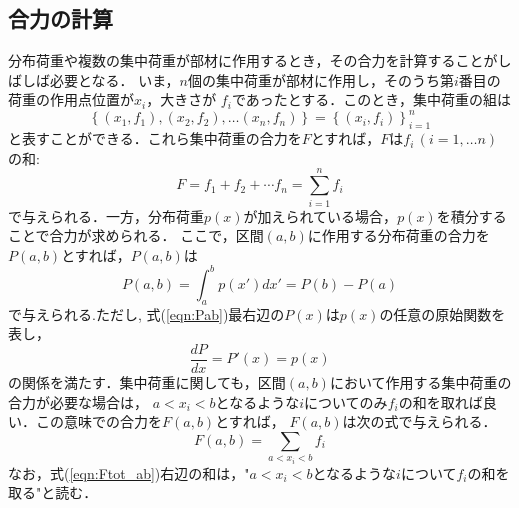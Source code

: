\documentclass[10pt,a4j]{jbook}
\begin{document}
\subsection{合力の計算}
分布荷重や複数の集中荷重が部材に作用するとき，その合力を計算することがしばしば必要となる．
いま，$n$個の集中荷重が部材に作用し，そのうち第$i$番目の荷重の作用点位置が$x_i$，大きさが
$f_i$であったとする．このとき，集中荷重の組は
\[
	\left\{ 
	(x_1,f_1),(x_2,f_2),\dots (x_n,f_n)
	\right\}
	=
	\left\{
		(x_i,f_i)
	\right\}_{i=1}^n
\]
と表すことができる．これら集中荷重の合力を$F$とすれば，$F$は$f_i\, (i=1,\dots n)$の和:
\begin{equation}
	F=f_1+f_2+\cdots f_n=\sum_{i=1}^n f_i
	\label{eq:Ftot}
\end{equation}
で与えられる．一方，分布荷重$p(x)$が加えられている場合，$p(x)$を積分することで合力が求められる．
ここで，区間$(a,b)$に作用する分布荷重の合力を$P(a,b)$とすれば，$P(a,b)$は
\begin{equation}
	P(a,b)=\int_{a}^{b}p(x')dx'=P(b)-P(a)
	\label{eqn:Pab}
\end{equation}
で与えられる.ただし, 式(\ref{eqn:Pab})最右辺の$P(x)$は$p(x)$の任意の原始関数を表し，
\begin{equation}
	\frac{dP}{dx}=P'(x)=p(x)
	\label{eqn:dPdx}
\end{equation}
の関係を満たす．集中荷重に関しても，区間$(a,b)$において作用する集中荷重の合力が必要な場合は，
$a< x_i < b$となるような$i$についてのみ$f_i$の和を取れば良い．この意味での合力を$F(a,b)$とすれば，
$F(a,b)$は次の式で与えられる．
\begin{equation}
	F(a,b)=\sum_{　a < x_i <b } f_i
	\label{eqn:Ftot_ab}
\end{equation}
なお，式(\ref{eqn:Ftot_ab})右辺の和は，"$a<x_i<b$となるような$i$について$f_i$の和を取る"と読む．
\end{document}
